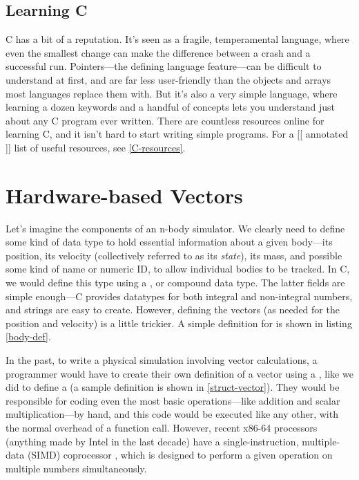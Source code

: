 \documentclass[thesis.tex]{subfiles}
\begin{document}
\subsection{Learning C}
C has a bit of a reputation. It's seen as a fragile, temperamental language, where even the smallest change can make the difference between a crash and a successful run. Pointers---the defining language feature---can be difficult to understand at first, and are far less user-friendly than the objects and arrays most languages replace them with. But it's also a very simple language, where learning a dozen keywords and a handful of concepts lets you understand just about any C program ever written. There are countless resources online for learning C, and it isn't hard to start writing simple programs. For a [[ annotated  ]] list of useful resources, see \ref{C-resources}.


\section{Hardware-based Vectors}

Let's imagine the components of an n-body simulator. We clearly need to define some kind of data type to hold essential information about a given body---its position, its velocity (collectively referred to as its \emph{state}), its mass, and possible some kind of name or numeric ID, to allow individual bodies to be tracked. In C, we would define this  type using a , or compound data type. The latter fields are simple enough---C provides datatypes for both integral and non-integral numbers, and strings are easy to create. However, defining the vectors (as needed for the position and velocity) is a little trickier. A simple definition for  is shown in listing \ref{body-def}.



In the past, to write a physical simulation involving vector calculations, a programmer would have to create their own definition of a vector using a , like we did to define a  (a sample definition is shown in \ref{struct-vector}). They would be responsible for coding even the most basic operations---like addition and scalar multiplication---by hand, and this code would be executed like any other, with the normal overhead of a function call. However, recent x86-64 processors (anything made by Intel in the last decade) have a single-instruction, multiple-data (SIMD) coprocessor \citep{intel-simd}, which is designed to perform a given operation on multiple numbers simultaneously.
\end{document}
